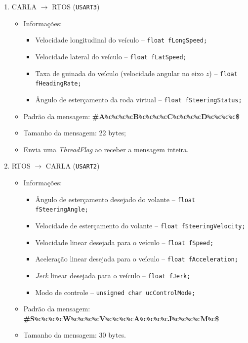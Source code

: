 \begin{enumerate}
	\item CARLA $\longrightarrow$ RTOS (\texttt{USART3})
	\begin{itemize}
		\item Informações:
		\begin{itemize}
			\item Velocidade longitudinal do veículo -- \texttt{float fLongSpeed;}
			\item Velocidade lateral do veículo -- \texttt{float fLatSpeed;}
			\item Taxa de guinada do veículo (velocidade angular no eixo $z$) -- \texttt{float fHeadingRate;}
			\item Ângulo de esterçamento da roda virtual -- \texttt{float fSteeringStatus;}		
		\end{itemize}
		\item Padrão da mensagem: \textbf{\#A}\texttt{\%c\%c\%c\%c}\textbf{B}\texttt{\%c\%c\%c\%c}\textbf{C}\texttt{\%c\%c\%c\%c}\textbf{D}\texttt{\%c\%c\%c\%c}\textbf{\$}
		\item Tamanho da mensagem: 22 bytes;
		\item Envia uma \textit{ThreadFlag} ao receber a mensagem inteira.
		
	\end{itemize}
	\item RTOS $\longrightarrow$ CARLA (\texttt{USART2})
	\begin{itemize}
		\item Informações:
		\begin{itemize}
			\item Ângulo de esterçamento desejado do volante -- \texttt{float fSteeringAngle;}
			\item Velocidade de esterçamento do volante -- \texttt{float fSteeringVelocity;}
			\item Velocidade linear desejada para o veículo -- \texttt{float fSpeed;}
			\item Aceleração linear desejada para o veículo -- \texttt{float fAcceleration;}
			\item \textit{Jerk} linear desejada para o veículo -- \texttt{float fJerk;}	
			\item Modo de controle -- \texttt{unsigned char ucControlMode;}		
		\end{itemize}
		\item Padrão da mensagem: \textbf{\#S}\texttt{\%c\%c\%c\%c}\textbf{W}\texttt{\%c\%c\%c\%c}\textbf{V}\texttt{\%c\%c\%c\%c}\textbf{A}\texttt{\%c\%c\%c\%c}\textbf{J}\texttt{\%c\%c\%c\%c}\textbf{M}\texttt{\%c}\textbf{\$}
		\item Tamanho da mensagem: 30 bytes.
		
	\end{itemize}
\end{enumerate}


